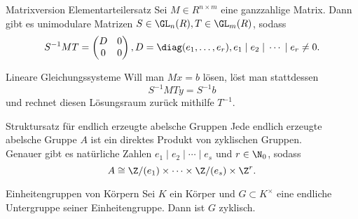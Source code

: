 \begin{karte}{Matrixversion Elementarteilersatz}
    Sei \(M\in R^{n\times m}\) eine ganzzahlige Matrix. Dann gibt es unimodulare
    Matrizen \(S \in \GL_n(R), T\in \GL_m(R)\), sodass 
    \[ S^{-1} M T = \begin{pmatrix}
        D & 0 \\ 0 & 0
    \end{pmatrix}, D = \diag(e_1, \ldots, e_r), e_1 \;|\; e_2 \;|\; \cdots \;|\; e_r \neq 0. \]
\end{karte}

\begin{karte}{Lineare Gleichungssysteme}
    Will man \(Mx = b\) lösen, löst man stattdessen 
    \[ S^{-1} M T y = S^{-1} b \]
    und rechnet diesen Lösungsraum zurück mithilfe \(T^{-1}\).
\end{karte}

\begin{karte}{Struktursatz für endlich erzeugte abelsche Gruppen}
    Jede endlich erzeugte abelsche Gruppe \(A\) ist ein direktes Produkt 
    von zyklischen Gruppen. \\
    Genauer gibt es natürliche Zahlen \(e_1 \;|\; e_2 \;|\; \cdots \;|\; e_s\) 
    und \(r\in \N_0\), sodass 
    \[ A \cong \Z/(e_1) \times \cdots \times \Z/(e_s) \times \Z^r. \]
\end{karte}

\begin{karte}{Einheitengruppen von Körpern}
    Sei \(K\) ein Körper und \(G\subset K^\times \) eine endliche 
    Untergruppe seiner Einheitengruppe. Dann ist \(G\) zyklisch.
\end{karte}